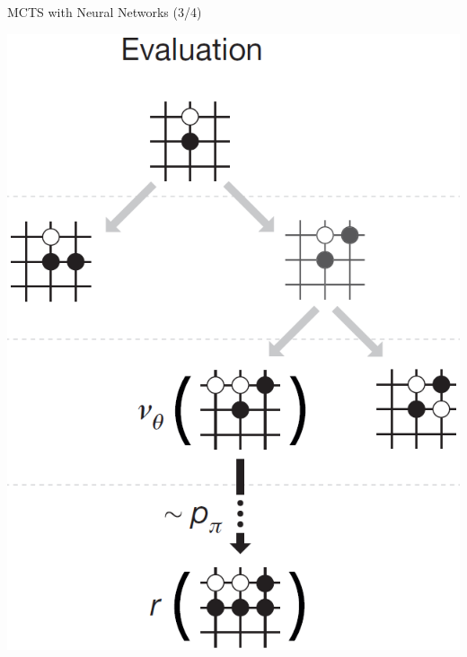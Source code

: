 \documentclass{beamer}
\begin{document}
{    \begin{frame}{MCTS with Neural Networks (3/4)}
      \begin{center}
        \includegraphics[height=.85\textheight]{../img/MCTS_evaluation.png}
      \end{center}
    \end{frame}

}
\end{document}

